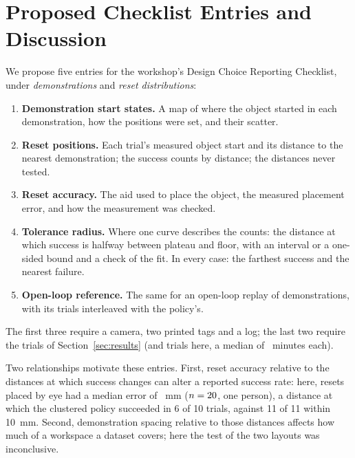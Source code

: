 \section{Proposed Checklist Entries and Discussion}
\label{sec:checklist}

We propose five entries for the workshop's Design Choice Reporting Checklist, under \emph{demonstrations} and \emph{reset distributions}:
\begin{enumerate}
\item \textbf{Demonstration start states.} A map of where the object started in each demonstration, how the positions were set, and their scatter.
\item \textbf{Reset positions.} Each trial's measured object start and its distance to the nearest demonstration; the success counts by distance; the distances never tested.
\item \textbf{Reset accuracy.} The aid used to place the object, the measured placement error, and how the measurement was checked.
\item \textbf{Tolerance radius.} Where one curve describes the counts: the distance at which success is halfway between plateau and floor, with an interval or a one-sided bound and a check of the fit. In every case: the farthest success and the nearest failure.
\item \textbf{Open-loop reference.} The same for an open-loop replay of demonstrations, with its trials interleaved with the policy's.
\end{enumerate}
The first three require a camera, two printed tags and a log; the last two require the trials of Section~\ref{sec:results} (\nTrialsClusteredThreshold and \nTrialsReplay trials here, a median of \trialMinutesMedian~minutes each).

Two relationships motivate these entries.
First, reset accuracy relative to the distances at which success changes can alter a reported success rate: here, resets placed by eye had a median error of \byEyeErrorMedian~mm ($n=20$, one person), a distance at which the clustered policy succeeded in 6 of 10 trials, against 11 of 11 within 10~mm. %
Second, demonstration spacing relative to those distances affects how much of a workspace a dataset covers; here the test of the two layouts was inconclusive.

